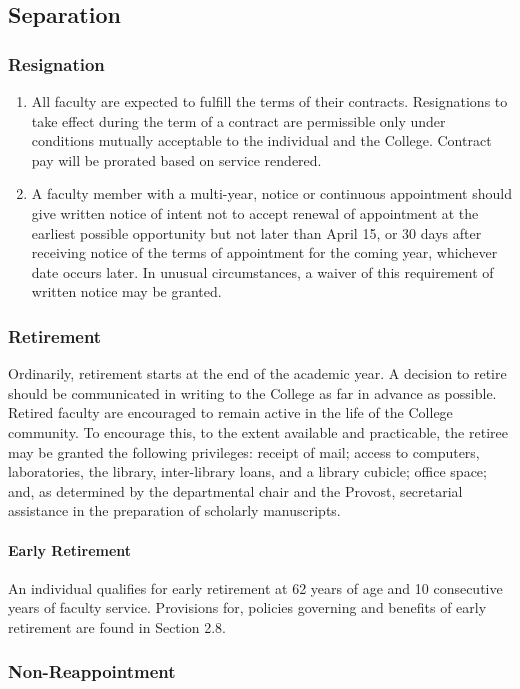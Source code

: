 	\subsection{Separation}
		\subsubsection{Resignation}
			\begin{enumerate}[label=\alph*)]
				\item{ All faculty are expected to fulfill the terms of their contracts.  Resignations to take effect during the term of a contract are permissible only under conditions mutually acceptable to the individual and the College.  Contract pay will be prorated based on service rendered.
				}
				\item{ A faculty member with a multi-year, notice or continuous appointment should give written notice of intent not to accept renewal of appointment at the earliest possible opportunity but not later than April 15, or 30 days after receiving notice of the terms of appointment for the coming year, whichever date occurs later. In unusual circumstances, a waiver of this requirement of written notice may be granted.
				}
			\end{enumerate}
		\subsubsection{Retirement}
			Ordinarily, retirement starts at the end of the academic year.  A decision to retire should be communicated in writing to the College as far in advance as possible.  Retired faculty are encouraged to remain active in the life of the College community.  To encourage this, to the extent available and practicable, the retiree may be granted the following privileges:  receipt of mail; access to computers, laboratories, the library, inter-library loans, and a library cubicle; office space; and, as determined by the departmental chair and the Provost, secretarial assistance in the preparation of scholarly manuscripts.
			\paragraph{Early Retirement}
				\label{sec:EarlyRetirement}
				An individual qualifies for early retirement at 62 years of age and 10 consecutive years of faculty service.  Provisions for, policies governing and benefits of early retirement are found in Section 2.8.
		\subsubsection{Non-Reappointment}
			\label{sec:NonReappointment}
